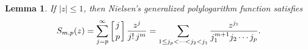 \documentclass[10pt,reqno,a4paper]{amsart}%
\newtheorem{lem}[theorem]{Lemma}
\theoremstyle{definition}
\begin{document}
\begin{lem}
\label{lem:Nielsen} If $|z|\leq1$, then Nielsen's generalized polylogarithm
function satisfies
\[
S_{m,p}(z)=\sum_{j=p}^{\infty}\left[  {%
\genfrac{}{}{0pt}{}{j}{p}%
}\right]  \frac{z^{j}}{j!\,j^{m}}=\sum_{1\leq j_{p}<\cdots<j_{2}<j_{1}}%
\frac{z^{j_{1}}}{j_{1}^{m+1}j_{2}\cdots j_{p}}.
\]

\end{lem}

\end{document}
